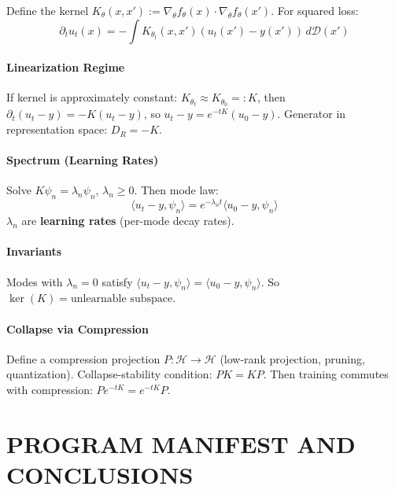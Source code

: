\documentclass[12pt, oneside]{article}
\begin{document}
Define the kernel $K_\theta(x,x') := \nabla_\theta f_\theta(x) \cdot \nabla_\theta f_\theta(x')$. For squared loss:
\begin{equation}
\partial_t u_t(x) = -\int K_{\theta_t}(x,x') (u_t(x') - y(x')) \, d\mathcal{D}(x')
\end{equation}

\subsection{Linearization Regime}

If kernel is approximately constant: $K_{\theta_t} \approx K_{\theta_0} =: K$, then $\partial_t (u_t - y) = -K(u_t - y)$, so $u_t - y = e^{-tK}(u_0 - y)$. Generator in representation space: $D_R = -K$.

\subsection{Spectrum (Learning Rates)}

Solve $K \psi_n = \lambda_n \psi_n$, $\lambda_n \geq 0$. Then mode law:
\begin{equation}
\langle u_t - y, \psi_n \rangle = e^{-\lambda_n t} \langle u_0 - y, \psi_n \rangle
\end{equation}
$\lambda_n$ are \textbf{learning rates} (per-mode decay rates).

\subsection{Invariants}

Modes with $\lambda_n = 0$ satisfy $\langle u_t - y, \psi_n \rangle = \langle u_0 - y, \psi_n \rangle$. So $\ker(K) = \text{unlearnable subspace}$.

\subsection{Collapse via Compression}

Define a compression projection $P: \mathcal{H} \rightarrow \mathcal{H}$ (low-rank projection, pruning, quantization). Collapse-stability condition: $PK = KP$. Then training commutes with compression: $Pe^{-tK} = e^{-tK}P$.

\newpage

\part{PROGRAM MANIFEST AND CONCLUSIONS}
\end{document}
